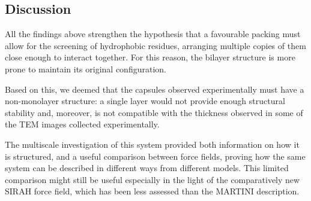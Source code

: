 \subsection{Discussion}
All the findings above strengthen the hypothesis that a favourable packing must allow for the screening of hydrophobic residues, arranging multiple copies of them close enough to interact together. For this reason, the bilayer structure is more prone to maintain its original configuration.

Based on this, we deemed that the capsules observed experimentally must have a non-monolayer structure: a single layer would not provide enough structural stability and, moreover, is not compatible with the thickness observed in some of the TEM images collected experimentally.

The multiscale investigation of this system provided both information on how it is structured, and a useful comparison between force fields, proving how the same system can be described in different ways from different models. This limited comparison might still be useful especially in the light of the comparatively new SIRAH force field, which has been less assessed than the MARTINI description.




%
%
%
%



